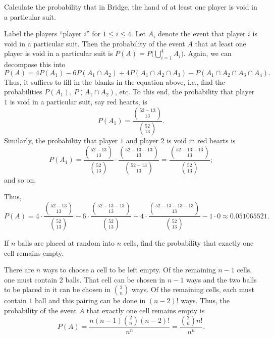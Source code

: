 \begin{problem}[Handout 2, \# 7]
  Calculate the probability that in Bridge, the hand of at least one player
  is void in a particular suit.
\end{problem}
\begin{solution*}
  Label the players ``player \(i\)'' for \(1\leq i\leq 4\). Let \(A_i\)
  denote the event that player \(i\) is void in a particular suit. Then
  the probability of the event \(A\) that at least one player is void in a
  particular suit is \(P(A)=P\bigl(\bigcup_{i=1}^4 A_i\bigr)\). Again, we
  can decompose this into
  \[
    P(A)=4P(A_1)-6P(A_1\cap A_2)+4P(A_1\cap A_2\cap A_3)-P(A_1\cap A_2\cap
    A_3\cap A_4).
  \]
  Thus, it suffices to fill in the blanks in the equation above, i.e., find
  the probabilities \(P(A_1)\), \(P(A_1\cap A_2)\), etc. To this end, the
  probability that player \(1\) is void in a particular suit, say red
  hearts, is
  \[
    P(A_1)=\frac{\binom{52-13}{13}}{\binom{52}{13}}.
  \]
  Similarly, the probability that player \(1\) and player \(2\) is void in
  red hearts is
  \[
    P(A_1)=\frac{\binom{52-13}{13}}{\binom{52}{13}}\cdot\frac{\binom{52-13-13}{13}}{\binom{52-13}{13}}=\frac{\binom{52-13-13}{13}}{\binom{52}{13}};
  \]
  and so on.

  Thus,
  \[
    P(A)=4\cdot\frac{\binom{52-13}{13}}{\binom{52}{13}}
    -6\cdot\frac{\binom{52-13-13}{13}}{\binom{52}{13}}
    +4\cdot\frac{\binom{52-13-13-13}{13}}{\binom{52}{13}}
    -1\cdot0\approx \num{0.051065521}.
  \]
\end{solution*}

\begin{problem}[Handout 2, \# 12]
  If \(n\) balls are placed at random into \(n\) cells, find the
  probability that exactly one cell remains empty.
\end{problem}
\begin{solution*}
  There are \(n\) ways to choose a cell to be left empty. Of the remaining
  \(n-1\) cells, one must contain \(2\) balls. That cell can be chosen in
  \(n-1\) ways and the two balls to be placed in it can be chosen in
  \(\binom{2}{n}\) ways. Of the remaining cells, each must contain \(1\)
  ball and this pairing can be done in \((n-2)!\) ways. Thus, the
  probability of the event \(A\) that exactly one cell remains empty is
  \[
    P(A)=\frac{n(n-1)\binom{2}{n}(n-2)!}{n^n}=\frac{\binom{2}{n}n!}{n^n}.
  \]
\end{solution*}

